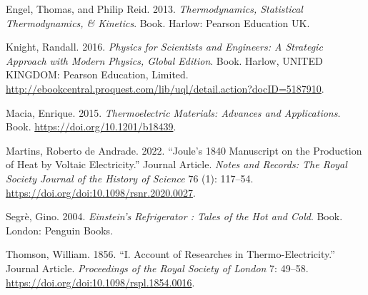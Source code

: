 \documentclass[
  letterpaper,
  DIV=11,
  numbers=noendperiod]{scrreprt}
\newlength{\cslhangindent}
\newlength{\cslentryspacingunit} %
\newenvironment{CSLReferences}[2] %
 {%
  \setlength{\parindent}{0pt}
  \ifodd #1
  \let\oldpar\par
  \def\par{\hangindent=\cslhangindent\oldpar}
  \fi
  \setlength{\parskip}{#2\cslentryspacingunit}
 }%
 {}
\begin{document}
\hypertarget{refs}{}
\begin{CSLReferences}{1}{0}
\leavevmode{}%
Engel, Thomas, and Philip Reid. 2013. \emph{Thermodynamics, Statistical
Thermodynamics, \& Kinetics}. Book. Harlow: Pearson Education UK.

\leavevmode{}%
Knight, Randall. 2016. \emph{Physics for Scientists and Engineers: A
Strategic Approach with Modern Physics, Global Edition}. Book. Harlow,
UNITED KINGDOM: Pearson Education, Limited.
\url{http://ebookcentral.proquest.com/lib/uql/detail.action?docID=5187910}.

\leavevmode{}%
Macia, Enrique. 2015. \emph{Thermoelectric Materials: Advances and
Applications}. Book. \url{https://doi.org/10.1201/b18439}.

\leavevmode{}%
Martins, Roberto de Andrade. 2022. {``Joule's 1840 Manuscript on the
Production of Heat by Voltaic Electricity.''} Journal Article.
\emph{Notes and Records: The Royal Society Journal of the History of
Science} 76 (1): 117--54.
\url{https://doi.org/doi:10.1098/rsnr.2020.0027}.

\leavevmode{}%
Segrè, Gino. 2004. \emph{Einstein's Refrigerator : Tales of the Hot and
Cold}. Book. London: Penguin Books.

\leavevmode{}%
Thomson, William. 1856. {``I. Account of Researches in
Thermo-Electricity.''} Journal Article. \emph{Proceedings of the Royal
Society of London} 7: 49--58.
\url{https://doi.org/doi:10.1098/rspl.1854.0016}.

\end{CSLReferences}
\end{document}
